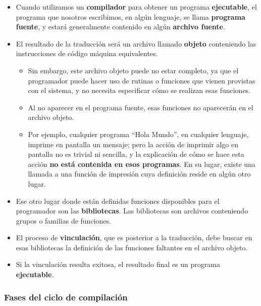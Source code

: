 \documentclass[spanish,A4,]{article}
\begin{document}
\begin{itemize}
\itemsep1pt\parskip0pt
\item
  Cuando utilizamos un \textbf{compilador} para obtener un programa
  \textbf{ejecutable}, el programa que nosotros escribimos, en algún
  lenguaje, se llama \textbf{programa fuente}, y estará generalmente
  contenido en algún \textbf{archivo fuente}.
\item
  El resultado de la traducción será un archivo llamado \textbf{objeto}
  conteniendo las instrucciones de código máquina equivalentes.

  \begin{itemize}
  \itemsep1pt\parskip0pt
  \item
    Sin embargo, este archivo objeto puede no estar completo, ya que el
    programador puede hacer uso de rutinas o funciones que vienen
    provistas con el sistema, y no necesita especificar cómo se realizan
    esas funciones.
  \item
    Al no aparecer en el programa fuente, esas funciones no aparecerán
    en el archivo objeto.\\
  \item
    Por ejemplo, cualquier programa ``Hola Mundo'', en cualquier
    lenguaje, imprime en pantalla un mensaje; pero la acción de imprimir
    algo en pantalla no es trivial ni sencilla, y la explicación de cómo
    se hace esta acción \textbf{no está contenida en esos programas}. En
    su lugar, existe una llamada a una función de impresión cuya
    definición reside en algún otro lugar.
  \end{itemize}
\item
  Ese otro lugar donde están definidas funciones disponibles para el
  programador son las \textbf{bibliotecas}. Las bibliotecas son archivos
  conteniendo grupos o familias de funciones.
\item
  El proceso de \textbf{vinculación}, que es posterior a la traducción,
  debe buscar en esas bibliotecas la definición de las funciones
  faltantes en el archivo objeto.
\item
  Si la vinculación resulta exitosa, el resultado final es un programa
  \textbf{ejecutable}.
\end{itemize}

\subsubsection{Fases del ciclo de
compilación}\label{fases-del-ciclo-de-compilaciuxf3n}
\end{document}
